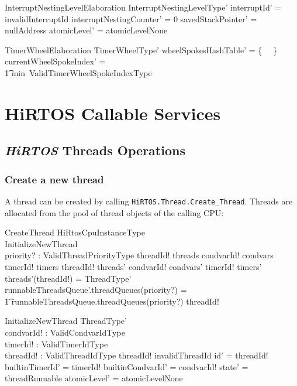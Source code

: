 \documentclass[11pt,letterpaper,twoside,openany]{book}
\begin{document}
\begin{schema}{InterruptNestingLevelElaboration}
   InterruptNestingLevelType'
\where
   interruptId' = invalidInterruptId
\also
   interruptNestingCounter' = 0
\also
   savedStackPointer' = nullAddress
\also
   atomicLevel' = atomicLevelNone
\end{schema}

\begin{schema}{TimerWheelElaboration}
   TimerWheelType'
\where
   \ran wheelSpokesHashTable' = \{~ \emptyset ~\}
\also
   currentWheelSpokeIndex' = \\
   \t1 min~ValidTimerWheelSpokeIndexType
\end{schema}

\section{HiRTOS Callable Services}

\subsection{\emph{HiRTOS} Threads Operations}

\subsubsection{Create a new thread}

A thread can be created by calling \verb`HiRTOS.Thread.Create_Thread`. Threads are allocated from the pool of
thread objects of the calling CPU:

\begin{schema}{CreateThread}
   \Delta HiRtosCpuInstanceType \\
   InitializeNewThread \\
   priority? : ValidThreadPriorityType
\where
   threadId! \notin \dom threads
\also
   condvarId! \notin \dom condvars
\also
   timerId! \notin \dom timers
\also
   threadId! \in \dom threads'
\also
   condvarId! \in \dom condvars'
\also
   timerId! \in \dom timers'
\also
   threads'(threadId!) = \theta ThreadType'
\also
    runnableThreadsQueue'.threadQueues(priority?) = \\
    \t1 runnableThreadsQueue.threadQueues(priority?) \cat \langle threadId! \rangle
\end{schema}

\begin{schema}{InitializeNewThread}
   ThreadType' \\
   condvarId! : ValidCondvarIdType \\
   timerId! : ValidTimerIdType \\
   threadId! : ValidThreadIdType
\where
   threadId! \neq invalidThreadId
\also
   id' = threadId!
\also
   builtinTimerId' = timerId!
\also
   builtinCondvarId' = condvarId!
\also
   state' = threadRunnable
\also
   atomicLevel' = atomicLevelNone
\end{schema}
\end{document}
